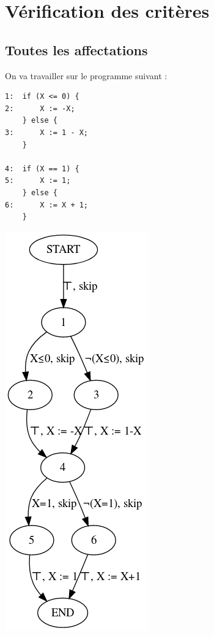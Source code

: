 \chapter{Vérification des critères}

\section{Toutes les affectations}
\label{sec:affectations}
On va travailler sur le programme suivant :

\begin{minipage}{0.46\textwidth}
\begin{verbatim}
1:  if (X <= 0) {
2:      X := -X;
    } else {
3:      X := 1 - X;
    }

4:  if (X == 1) {
5:      X := 1;
    } else {
6:      X := X + 1;
    }
\end{verbatim}
\end{minipage}
\begin{minipage}{0.46\textwidth}
	\includegraphics[scale=0.5]{pics/simpleCFG.png}
\end{minipage}


